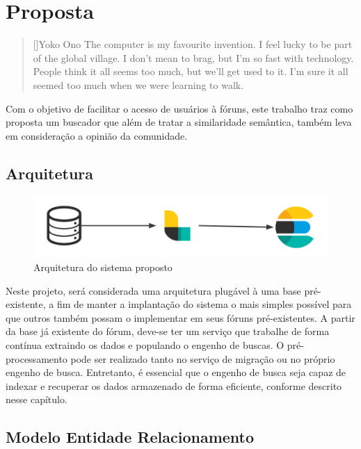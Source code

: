 \chapter{Proposta}
\label{cap:project}

\begin{quotation}[]{Yoko Ono}
The computer is my favourite invention. I feel lucky to be part of the global village. I don't mean to brag, but I'm so fast with technology. People think it all seems too much, but we'll get used to it. I'm sure it all seemed too much when we were learning to walk.
\end{quotation}

Com o objetivo de facilitar o acesso de usuários à fóruns, este trabalho traz como proposta um buscador que além de tratar a similaridade semântica, também leva em consideração a opinião da comunidade.
\section{Arquitetura}
\begin{figure}[htb]
	\centering
	\includegraphics[width=\textwidth]{chapters/project/architecture.png}
	\caption{Arquitetura do sistema proposto}
\end{figure}
Neste projeto, será considerada uma arquitetura plugável à uma base pré-existente, a fim de manter a implantação do sistema o mais simples possível para que outros também possam o implementar em seus fóruns pré-existentes. 
A partir da base já existente do fórum, deve-se ter um serviço que trabalhe de forma contínua extraindo os dados e populando o engenho de buscas. O pré-processamento pode ser realizado tanto no serviço de migração ou no próprio engenho de busca. Entretanto, é essencial que o engenho de busca seja capaz de indexar e recuperar os dados armazenado de forma eficiente, conforme descrito nesse capítulo.

\section{Modelo Entidade Relacionamento}
\label{mer}


